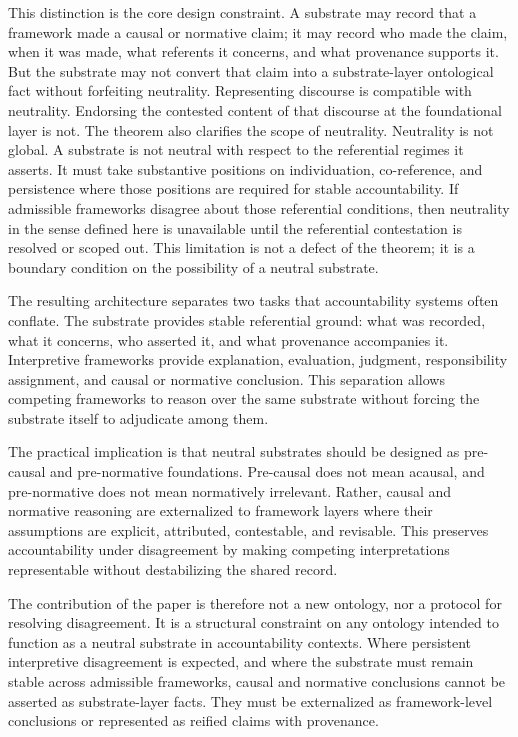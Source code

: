 This distinction is the core design constraint.
A substrate may record that a framework made a causal or normative claim;
it may record who made the claim,
when it was made,
what referents it concerns,
and what provenance supports it.
But the substrate may not convert that claim
into a substrate-layer ontological fact
without forfeiting neutrality.
Representing discourse is compatible with neutrality.
Endorsing the contested content of that discourse
at the foundational layer is not.
The theorem also clarifies the scope of neutrality.
Neutrality is not global.
A substrate is not neutral with respect to
the referential regimes it asserts.
It must take substantive positions on individuation,
co-reference, and persistence
where those positions are required for stable accountability.
If admissible frameworks disagree about those referential conditions,
then neutrality in the sense defined here is unavailable
until the referential contestation is resolved or scoped out.
This limitation is not a defect of the theorem;
it is a boundary condition on the possibility of a neutral substrate.

The resulting architecture separates two tasks
that accountability systems often conflate.
The substrate provides stable referential ground:
what was recorded,
what it concerns,
who asserted it,
and what provenance accompanies it.
Interpretive frameworks provide explanation,
evaluation, judgment, responsibility assignment,
and causal or normative conclusion.
This separation allows competing frameworks to reason
over the same substrate without forcing the substrate itself
to adjudicate among them.

The practical implication is that neutral substrates
should be designed as pre-causal and pre-normative foundations.
Pre-causal does not mean acausal,
and pre-normative does not mean normatively irrelevant.
Rather, causal and normative reasoning are externalized
to framework layers where their assumptions are explicit,
attributed, contestable, and revisable.
This preserves accountability under disagreement
by making competing interpretations representable
without destabilizing the shared record.

The contribution of the paper is therefore not a new ontology,
nor a protocol for resolving disagreement.
It is a structural constraint on any ontology intended to function
as a neutral substrate in accountability contexts.
Where persistent interpretive disagreement is expected,
and where the substrate must remain stable across admissible frameworks,
causal and normative conclusions cannot be asserted as substrate-layer facts.
They must be externalized as framework-level conclusions
or represented as reified claims with provenance.

